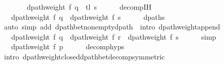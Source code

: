 \begin{isabellebody}
\ \ \isamarkupfalse%
\ \isamarkupfalse%
\ {\isachardoublequoteopen}{\isachardot}{\kern0pt}{\isachardot}{\kern0pt}{\isachardot}{\kern0pt}\ {\isasymle}\ dpath{\isacharunderscore}{\kern0pt}weight\ f\ {\isacharparenleft}{\kern0pt}q\ {\isacharat}{\kern0pt}\ tl\ s{\isacharparenright}{\kern0pt}{\isachardoublequoteclose}\isanewline
\ \ \ \ \isamarkupfalse%
\ decomp{\isachardot}{\kern0pt}IH\isanewline
\ \ \ \ \isacommand{{\isachardot}{\kern0pt}}\isamarkupfalse%
\isanewline
\ \ \isamarkupfalse%
\ \isamarkupfalse%
\ {\isachardoublequoteopen}{\isachardot}{\kern0pt}{\isachardot}{\kern0pt}{\isachardot}{\kern0pt}\ {\isacharequal}{\kern0pt}\ dpath{\isacharunderscore}{\kern0pt}weight\ f\ q\ {\isacharplus}{\kern0pt}\ dpath{\isacharunderscore}{\kern0pt}weight\ f\ s{\isachardoublequoteclose}\isanewline
\ \ \ \ \isamarkupfalse%
\ dpaths\isanewline
\ \ \ \ \isamarkupfalse%
\ {\isacharparenleft}{\kern0pt}auto\ simp\ add{\isacharcolon}{\kern0pt}\ dpath{\isacharunderscore}{\kern0pt}bet{\isacharunderscore}{\kern0pt}nonempty{\isacharunderscore}{\kern0pt}dpath{\isacharparenleft}{\kern0pt}{}{\isacharcomma}{\kern0pt}\ {}{\isacharparenright}{\kern0pt}\ intro{\isacharcolon}{\kern0pt}\ dpath{\isacharunderscore}{\kern0pt}weight{\isacharunderscore}{\kern0pt}append{\isacharunderscore}{\kern0pt}{}{\isacharparenright}{\kern0pt}\isanewline
\ \ \isamarkupfalse%
\ \isamarkupfalse%
\ {\isachardoublequoteopen}{\isachardot}{\kern0pt}{\isachardot}{\kern0pt}{\isachardot}{\kern0pt}\ {\isasymle}\ dpath{\isacharunderscore}{\kern0pt}weight\ f\ q\ {\isacharplus}{\kern0pt}\ dpath{\isacharunderscore}{\kern0pt}weight\ f\ r\ {\isacharplus}{\kern0pt}\ dpath{\isacharunderscore}{\kern0pt}weight\ f\ s{\isachardoublequoteclose}\isanewline
\ \ \ \ \isamarkupfalse%
\ simp\isanewline
\ \ \isamarkupfalse%
\ \isamarkupfalse%
\ {\isachardoublequoteopen}{\isachardot}{\kern0pt}{\isachardot}{\kern0pt}{\isachardot}{\kern0pt}\ {\isacharequal}{\kern0pt}\ dpath{\isacharunderscore}{\kern0pt}weight\ f\ p{\isachardoublequoteclose}\isanewline
\ \ \ \ \isamarkupfalse%
\ decomp{\isachardot}{\kern0pt}hyps\isanewline
\ \ \ \ \isamarkupfalse%
\ {\isacharparenleft}{\kern0pt}intro\ dpath{\isacharunderscore}{\kern0pt}weight{\isacharunderscore}{\kern0pt}closed{\isacharunderscore}{\kern0pt}dpath{\isacharunderscore}{\kern0pt}bet{\isacharunderscore}{\kern0pt}decomp{\isacharbrackleft}{\kern0pt}symmetric{\isacharbrackright}{\kern0pt}{\isacharparenright}{\kern0pt}\isanewline

\end{isabellebody}
